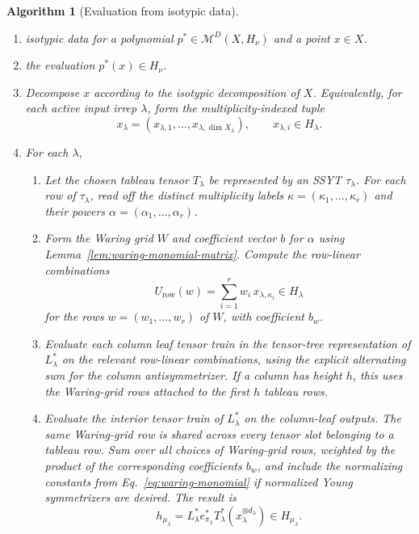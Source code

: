 \documentclass[11pt]{article}
\newcommand{\scM}{\mathcal{M}}
\newtheorem{algorithm}[theorem]{Algorithm}
\theoremstyle{definition}
\begin{document}
\begin{algorithm}[Evaluation from isotypic data]\label{alg:evaluate-basis}

  \phantom{}

  \begin{enumerate}[label=\textbf{Step \arabic*.},leftmargin=2.8cm]

    \item[\textbf{Input:}] isotypic data for a polynomial $p^* \in \scM^D(X,H_\nu)$ and a point $x \in X$.

    \item[\textbf{Output:}] the evaluation $p^*(x) \in H_\nu$.

    \item Decompose $x$ according to the isotypic decomposition of $X$.  Equivalently, for each active input irrep $\lambda$, form the multiplicity-indexed tuple
    \[
      x_\lambda=(x_{\lambda,1},\dots,x_{\lambda,\dim X_\lambda}),
      \qquad
      x_{\lambda,i}\in H_\lambda.
    \]

    \item For each $\lambda$,
    \begin{enumerate}[label=\textup{(\alph*)},leftmargin=2.2em]
      \item Let the chosen tableau tensor $T_\lambda$ be represented by an SSYT $\tau_\lambda$.  For each row of $\tau_\lambda$, read off the distinct multiplicity labels $\kappa=(\kappa_1,\dots,\kappa_r)$ and their powers $\alpha=(\alpha_1,\dots,\alpha_r)$.

      \item Form the Waring grid $W$ and coefficient vector $b$ for $\alpha$ using Lemma~\ref{lem:waring-monomial-matrix}.  Compute the row-linear combinations
      \[
        U_{\mathrm{row}}(w)
        =
        \sum_{i=1}^r w_i\,x_{\lambda,\kappa_i}
        \in H_\lambda
      \]
      for the rows $w=(w_1,\dots,w_r)$ of $W$, with coefficient $b_w$.

      \item Evaluate each column leaf tensor train in the tensor-tree representation of $L_\lambda^*$ on the relevant row-linear combinations, using the explicit alternating sum for the column antisymmetrizer.  If a column has height $h$, this uses the Waring-grid rows attached to the first $h$ tableau rows.

      \item Evaluate the interior tensor train of $L_\lambda^*$ on the column-leaf outputs.  The same Waring-grid row is shared across every tensor slot belonging to a tableau row.  Sum over all choices of Waring-grid rows, weighted by the product of the corresponding coefficients $b_w$, and include the normalizing constants from Eq.~\eqref{eq:waring-monomial} if normalized Young symmetrizers are desired.  The result is
      \[
        h_{\mu_\lambda}
        =
        L_\lambda^*e_{\pi_\lambda}^*T_\lambda^*(x_\lambda^{\otimes d_\lambda})
        \in H_{\mu_\lambda}.
      \]
    \end{enumerate}


\end{enumerate}
\end{algorithm}
\end{document}
